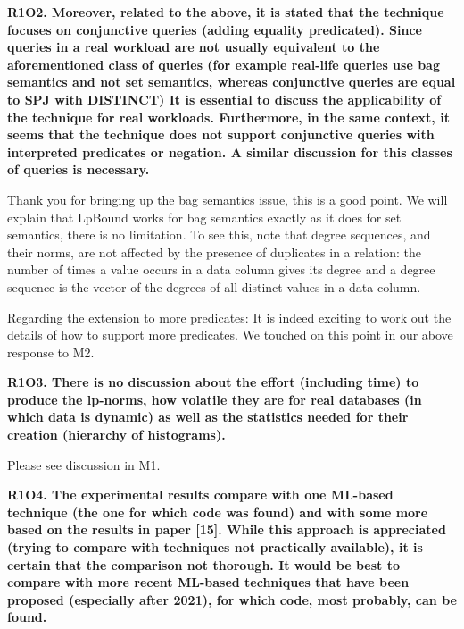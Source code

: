 \vspace{0.5em}\noindent
\textbf{
R1O2. Moreover, related to the above, it is stated that the technique focuses on conjunctive queries (adding equality predicated). Since queries in a real workload are not usually equivalent to the aforementioned class of queries (for example real-life queries use bag semantics and not set semantics, whereas conjunctive queries are equal to SPJ with DISTINCT) It is essential to discuss the applicability of the technique for real workloads. Furthermore, in the same context, it seems that the technique does not support conjunctive queries with interpreted predicates or negation. A similar discussion for this classes of queries is necessary. 
}

{
\color{blue}
Thank you for bringing up the bag semantics issue, this is a good point. We will explain that LpBound works for bag semantics exactly as it does for set semantics, there is no limitation. To see this, note that degree sequences, and their norms, are not affected by the presence of duplicates in a relation: the number of times a value occurs in a data column gives its degree and a degree sequence is the vector of the degrees of all distinct values in a data column.

Regarding the extension to more predicates: It is indeed exciting to work out the details of how to support more predicates. We touched on this point in our above response to M2.
}


\vspace{0.5em}\noindent
\textbf{
R1O3. There is no discussion about the effort (including time) to produce the lp-norms, how volatile they are for real databases (in which data is dynamic) as well as the statistics needed for their creation (hierarchy of histograms). 
}

{
\color{blue}
Please see discussion in M1. 
}

\vspace{0.5em}\noindent
\textbf{
R1O4. The experimental results compare with one ML-based technique (the one for which code was found) and with some more based on the results in paper [15]. While this approach is appreciated (trying to compare with techniques not practically available), it is certain that the comparison not thorough. It would be best to compare with more recent ML-based techniques that have been proposed (especially after 2021), for which code, most probably, can be found. 
}

